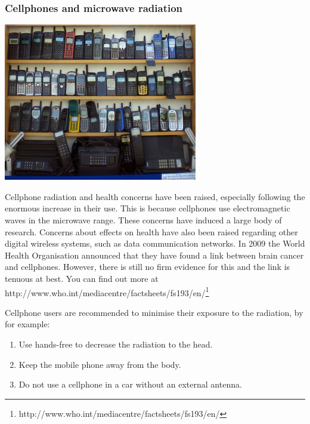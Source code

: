             \subsubsection*{Cellphones and microwave radiation}
            \nopagebreak
\begin{minipage}{.5\textwidth}
\includegraphics[width=.8\columnwidth]{photos/cellphones_kapungo.jpg}
\end{minipage}
\begin{minipage}{.5\textwidth}
            \label{m38779*id189654}Cellphone radiation and health concerns have been raised, especially following the enormous increase in their use. This is because cellphones use electromagnetic waves in the microwave range. These concerns have induced a large body of research. Concerns about effects on health have also been raised regarding other digital wireless systems, such as data communication networks.
In 2009 the World Health Organisation announced that they have found a link between brain cancer and cellphones. However, there is still no firm evidence for this and the link is tenuous at best. You can find out more at http://www.who.int/mediacentre/factsheets/fs193/en/\footnote{http://www.who.int/mediacentre/factsheets/fs193/en/}
        \par 
\end{minipage}
        \label{m38779*id189664}Cellphone users are recommended to minimise their exposure to the radiation, by for example:\par 
        \label{m38779*id189668}\begin{enumerate}[noitemsep, label=\textbf{\arabic*}. ] 
            \label{m38779*uid24}\item Use hands-free to decrease the radiation to the head.
\label{m38779*uid25}\item Keep the mobile phone away from the body.
\label{m38779*uid26}\item Do not use a cellphone in a car without an external antenna.
\end{enumerate}
